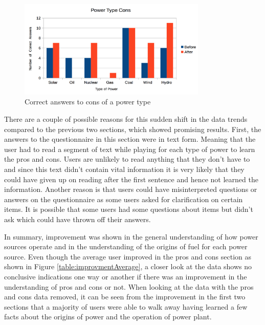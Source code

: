 \documentclass[msc,oneside]{ubcthesis}%
\begin{document}
\begin{figure}[hbt]
  \begin{center}
    \includegraphics[width=0.8\textwidth]{survey_pics/post_and_pre/cons}
    \caption[Correct cons]{Correct answers to cons of a power type}\label{cons}
  \end{center}
\end{figure}

\indent There are a couple of possible reasons for this sudden shift in the data trends compared to the previous two sections, which showed promising results. First, the answers to the questionnaire in this section were in text form. Meaning that the user had to read a segment of text while playing for each type of power to learn the pros and cons. Users are unlikely to read anything that they don't have to and since this text didn't contain vital information it is very likely that they could have given up on reading after the first sentence and hence not learned the information. Another reason is that users could have misinterpreted questions or answers on the questionnaire as some users asked for clarification on certain items. It is possible that some users had some questions about items but didn't ask which could have thrown off their answers.

\indent In summary, improvement was shown in the general understanding of how power sources operate and in the understanding of the origins of fuel for each power source. Even though the average user improved in the pros and cons section as shown in Figure \ref{table:improvmentAverage}, a closer look at the data shows no conclusive indications one way or another if there was an improvement in the understanding of pros and cons or not. When looking at the data with the pros and cons data removed, it can be seen from the improvement in the first two sections that a majority of users were able to walk away having learned a few facts about the origins of power and the operation of power plant. 
\end{document}
